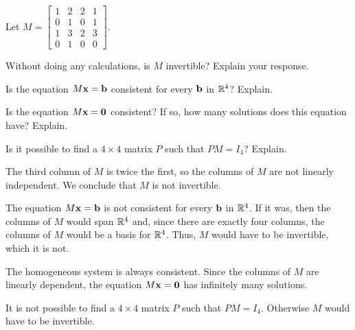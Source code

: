 \begin{example} Let $M = \left[ \begin{array}{cccc} 1&2&2&1 \\ 0&1&0&1 \\ 1&3&2&3 \\ 0&1&0&0 \end{array} \right]$. 
\ba
\item Without doing any calculations, is $M$ invertible? Explain your response.

\item Is the equation $M \mathbf{x} = \mathbf{b}$ consistent for every $\mathbf{b}$ in $\mathbb{R}^4$? Explain.

\item Is the equation $M \mathbf{x} = \mathbf{0}$ consistent? If so, how many solutions does this equation have? Explain. 

\item Is it possible to find a $4 \times 4$ matrix $P$ such that $PM = I_4$? Explain.

\ea


\ExampleSolution
\ba
\item The third column of $M$ is twice the first, so the columns of $M$ are not linearly independent. We conclude that $M$ is not invertible.

\item The equation $M \mathbf{x} = \mathbf{b}$ is not consistent for every $\mathbf{b}$ in $\mathbb{R}^4$. If it was, then the columns of $M$ would span $\mathbb{R}^4$ and, since there are exactly four columns, the columns of $M$ would be a basis for $\mathbb{R}^4$. Thus, $M$ would have to be invertible, which it is not.

\item The homogeneous system is always consistent. Since the columns of $M$ are linearly dependent, the equation $M \mathbf{x} = \mathbf{0}$ has infinitely many solutions.

\item It is not possible to find a $4 \times 4$ matrix $P$ such that $PM = I_4$. Otherwise $M$ would have to be invertible. 

\ea

\end{example}



